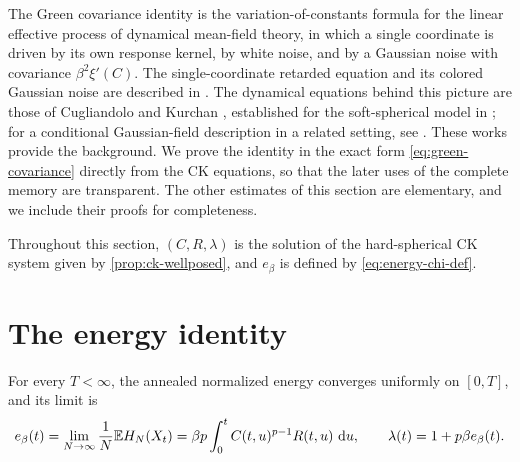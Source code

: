 The Green covariance identity is the variation-of-constants formula for the linear effective process of dynamical mean-field theory, in which a single coordinate is driven by its own response kernel, by white noise, and by a Gaussian noise with covariance $\beta^2\xi'(C)$. The single-coordinate retarded equation and its colored Gaussian noise are described in \cite[arXiv version~2, Section~9.5, Equation~(9.56), p.~55; see also Equations~(9.13)--(9.14), p.~45]{cugliandolo2004}. The dynamical equations behind this picture are those of Cugliandolo and Kurchan \cite[arXiv version~1, Equations~(2)--(4), pp.~2--3]{ck1993}, established for the soft-spherical model in \cite[arXiv version~1, Theorem~1.2, p.~5]{bag2006}; for a conditional Gaussian-field description in a related setting, see \cite[arXiv version~2, Remark~1.4, Equations~(1.23)--(1.24), p.~5]{ds2020}. These works provide the background. We prove the identity in the exact form \eqref{eq:green-covariance} directly from the CK equations, so that the later uses of the complete memory are transparent. The other estimates of this section are elementary, and we include their proofs for completeness.

Throughout this section, $(C,R,\lambda)$ is the solution of the hard-spherical CK system given by \cref{prop:ck-wellposed}, and $e_\beta$ is defined by \eqref{eq:energy-chi-def}.

\section{The energy identity}\label{sec:energy-identity}

\begin{proposition}\label{prop:energy-bridge}
For every $T<\infty$, the annealed normalized energy converges uniformly on $[0,T]$, and its limit is
\begin{equation}
e_\beta(t)=\lim_{N\to\infty}\frac1N\mathbb E H_N(X_t)
=\beta p\int_0^t C(t,u)^{p-1}R(t,u)\,\mathop{}\!\mathrm d u,
\qquad
\lambda(t)=1+p\beta e_\beta(t).
\label{eq:energy-identity}
\end{equation}
\end{proposition}

